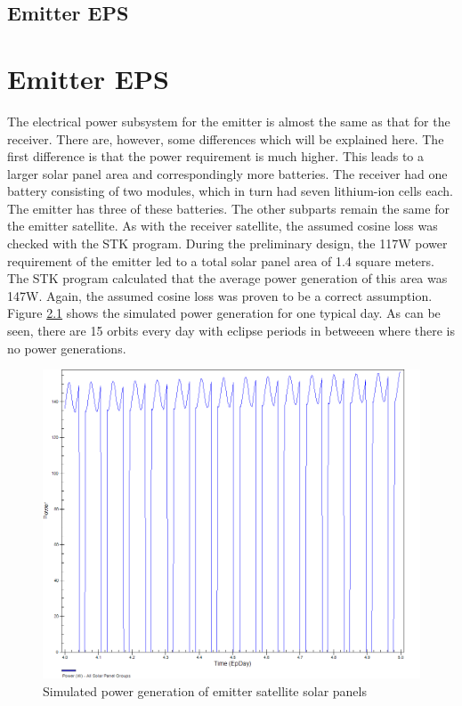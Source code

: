 \section{Emitter EPS}
\label{emitter_EPS}

\chapter{Emitter EPS}
\label{emitter_EPS}

The electrical power subsystem for the emitter is almost the same as that for the receiver. There are, however, some differences which will be explained here. The first difference is that the power requirement is much higher. This leads to a larger solar panel area and correspondingly more batteries. The receiver had one battery consisting of two modules, which in turn had seven lithium-ion cells each. The emitter has three of these batteries. 
The other subparts remain the same for the emitter satellite.
As with the receiver satellite, the assumed cosine loss was checked with the STK program. During the preliminary design, the 117W power requirement of the emitter led to a total solar panel area of 1.4 square meters. The STK program calculated that the average power generation of this area was 147W. Again, the assumed cosine loss was proven to be a correct assumption. Figure \ref{fig:powersim} shows the simulated power generation for one typical day. As can be seen, there are 15 orbits every day with eclipse periods in betweeen where there is no power generations.

\begin{figure}[H!]
\centering
\includegraphics{img/powerSim.png}
\caption{Simulated power generation of emitter satellite solar panels}
\label{fig:powersim}
\end{figure}


